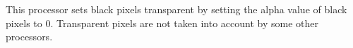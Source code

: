 This processor sets black pixels transparent by setting the alpha value of black pixels to 0. Transparent pixels are not taken into account by some other processors.
